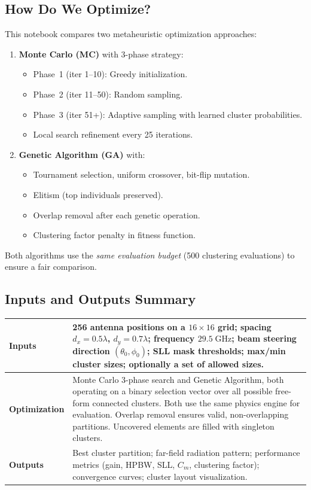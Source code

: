 \documentclass[11pt,a4paper]{article}
\begin{document}
\subsection{How Do We Optimize?}

This notebook compares two metaheuristic optimization approaches:
\begin{enumerate}
    \item \textbf{Monte Carlo (MC)} with 3-phase strategy:
    \begin{itemize}
        \item Phase~1 (iter 1--10): Greedy initialization.
        \item Phase~2 (iter 11--50): Random sampling.
        \item Phase~3 (iter 51+): Adaptive sampling with learned cluster probabilities.
        \item Local search refinement every 25 iterations.
    \end{itemize}
    \item \textbf{Genetic Algorithm (GA)} with:
    \begin{itemize}
        \item Tournament selection, uniform crossover, bit-flip mutation.
        \item Elitism (top individuals preserved).
        \item Overlap removal after each genetic operation.
        \item Clustering factor penalty in fitness function.
    \end{itemize}
\end{enumerate}

Both algorithms use the \emph{same evaluation budget} (500 clustering evaluations)
to ensure a fair comparison.

\subsection{Inputs and Outputs Summary}

\begin{center}
\renewcommand{\arraystretch}{1.3}
\begin{tabular}{p{3cm} p{10cm}}
\toprule
\textbf{Inputs} & 256 antenna positions on a $16\times16$ grid; spacing $d_x=0.5\lambda$,
$d_y=0.7\lambda$; frequency $29.5\;\text{GHz}$; beam steering direction $(\theta_0, \phi_0)$;
SLL mask thresholds; max/min cluster sizes; optionally a set of allowed sizes. \\
\midrule
\textbf{Optimization} & Monte Carlo 3-phase search and Genetic Algorithm, both operating on
a binary selection vector over all possible free-form connected clusters.
Both use the same physics engine for evaluation.
Overlap removal ensures valid, non-overlapping partitions.
Uncovered elements are filled with singleton clusters. \\
\midrule
\textbf{Outputs} & Best cluster partition; far-field radiation pattern;
performance metrics (gain, HPBW, SLL, $C_m$, clustering factor);
convergence curves; cluster layout visualization. \\
\bottomrule
\end{tabular}
\end{center}
\end{document}
